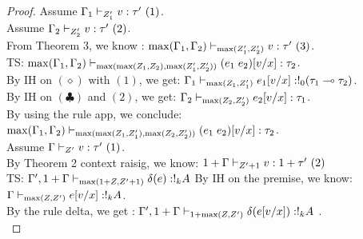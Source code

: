 \begin{proof}
  
  Assume  $\Gamma_1 \vdash_{Z_1'} v : \tau' ~(1) $.\\
  Assume $\Gamma_2 \vdash_{Z_2'} v : \tau' ~(2) $.\\
  From Theorem 3, we know : $\max(\Gamma_1,\Gamma_2)
  \vdash_{\max(Z_1', Z_2')} v : \tau' ~(3) $.\\
   TS:   $\max (\Gamma_1, \Gamma_2 ) \vdash_{ \max(\max(
     Z_1,Z_2) , \max(Z_1', Z_2') ) } (e_1 \; e_2)[v/x] : \tau_2$.\\
By IH on $(\diamond)$ with $(1)$, we get: $ \Gamma_1
\vdash_{\max(Z_1, Z_1' )} e_1 [v/x]:  !_{0} ( \tau_1
\multimap \tau_2   )  $.\\
By IH on $(\clubsuit)$ and $(2)$, we get: $ \Gamma_2
\vdash_{\max(Z_2, Z_2')}
e_2 [v/x]: \tau_1  $.\\
By using the rule app, we conclude:\\
  $\max (\Gamma_1, \Gamma_2 ) \vdash_{ \max(\max(
     Z_1,Z_1') , \max(Z_2, Z_2') ) } (e_1 \; e_2)[v/x] : \tau_2$.\\

  Assume  $\Gamma  \vdash_{Z'} v : \tau' ~(1) $.\\
   By Theorem 2 context raisig, we know: $1+\Gamma \vdash_{Z'+1} v : 1+\tau' ~(2) $\\
   TS:
   $\Gamma' ,1+\Gamma \vdash_{ \max( 1+Z, Z'+1)  } \delta(e): !_{k} A $
   By IH on the premise, we know: $ \Gamma
   \vdash_{\max(Z,Z')} e[v/x]: !_{k} A $.\\
   By the rule delta, we get :
      $\Gamma' ,1+\Gamma \vdash_{1+ \max( Z, Z')  } \delta(e[v/x]): !_{k} A $
.\\
  
  


\end{proof}
